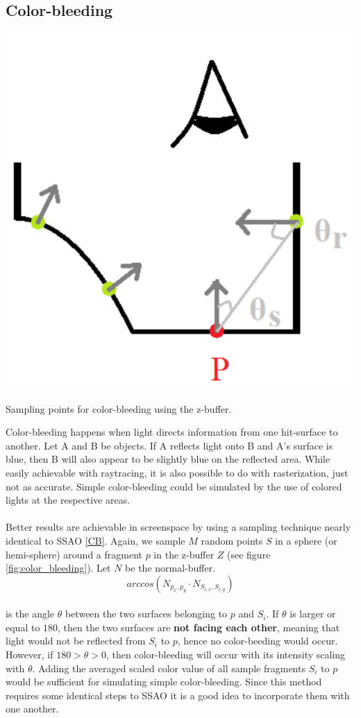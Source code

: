 \documentclass{ACGSeminar}
\begin{document}
	\subsection{Color-bleeding}%
		\begin{floatingfigure}[l]{.3\textwidth}%
			\includegraphics[width=.3\textwidth]{img/color_bleeding_sampling.png}%

			\caption{Sampling points for color-bleeding using the z-buffer.}%
			\label{fig:color_bleeding}%
		\end{floatingfigure}%
		Color-bleeding happens when light directs information from one hit-surface to another. Let A and B be objects. If A reflects light onto B and A's surface is blue, then B will also appear to be slightly blue on the reflected area. While easily achievable with raytracing, it is also possible to do with rasterization, just not as accurate. Simple color-bleeding could be simulated by the use of colored lights at the respective areas. \\\\
		Better results are achievable in screenspace by using a sampling technique nearly identical to SSAO \ref{CB}. Again, we sample $M$ random points $S$ in a sphere (or hemi-sphere) around a fragment $p$ in the z-buffer $Z$ (see figure \ref{fig:color_bleeding}). Let $N$ be the normal-buffer.
		$$ arccos(N_{p_{x}, p_{y}} \cdot N_{S_{i, x}, S_{i, y}}) $$
		\\
		is the angle $\theta$ between the two surfaces belonging to $p$ and $S_i$. If $\theta$ is larger or equal to $180$, then the two surfaces are \textbf{not facing each other}, meaning that light would not be reflected from $S_i$ to $p$, hence no color-beeding would occur. However, if $180 > \theta > 0$, then color-bleeding will occur with its intensity scaling with $\theta$. Adding the averaged scaled color value of all sample fragments $S_i$ to $p$ would be sufficient for simulating simple color-bleeding. Since this method requires some identical steps to SSAO it is a good idea to incorporate them with one another. \\\\
\end{document}
